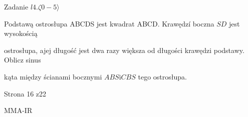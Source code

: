 \documentclass[a4paper,12pt]{article}
\begin{document}
Zadanie $l4. \zeta 0-5\rangle$

Podstawą ostrosłupa ABCDS jest kwadrat ABCD. Krawędzí boczna $SD$ jest wysokością

ostrosłupa, ajej długość jest dwa razy większa od długości krawędzi podstawy. Oblicz sinus

kąta między ścianami bocznymi $ABS\mathrm{i}CBS$ tego ostrosłupa.

Strona 16 z22

MMA-IR
\end{document}
